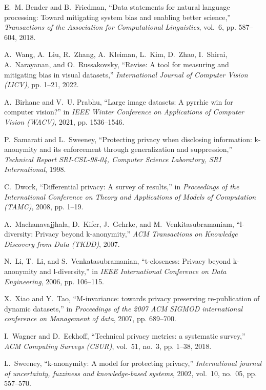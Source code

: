 \documentclass[journal]{IEEEtran}
\begin{document}
\begin{thebibliography}{100}
E.~M. Bender and B.~Friedman, ``Data statements for natural language
processing: Toward mitigating system bias and enabling better science,''
\emph{Transactions of the Association for Computational Linguistics}, vol.~6,
pp. 587--604, 2018.

A.~Wang, A.~Liu, R.~Zhang, A.~Kleiman, L.~Kim, D.~Zhao, I.~Shirai,
A.~Narayanan, and O.~Russakovsky, ``Revise: A tool for measuring and mitigating bias in visual datasets,'' \emph{International Journal of Computer Vision (IJCV)}, pp. 1--21, 2022.

A.~Birhane and V.~U. Prabhu, ``Large image datasets: A pyrrhic win for computer vision?'' in \emph{IEEE Winter Conference on Applications of Computer Vision (WACV)}, 2021, pp.
1536--1546.

P.~Samarati and L.~Sweeney, ``Protecting privacy when disclosing information: k-anonymity and its enforcement through generalization and suppression,'' \emph{Technical Report {SRI-CSL-98-04}, Computer Science Laboratory, {SRI} International}, 1998.

C.~Dwork, ``Differential privacy: A survey of results,'' in \emph{Proceedings of the International Conference on Theory and Applications of Models of Computation (TAMC)}, 2008, pp. 1--19.

A.~Machanavajjhala, D.~Kifer, J.~Gehrke, and M.~Venkitasubramaniam,
``l-diversity: Privacy beyond k-anonymity,'' \emph{ACM Transactions on Knowledge Discovery from Data (TKDD)}, 2007.

N.~Li, T.~Li, and S.~Venkatasubramanian, ``t-closeness: Privacy beyond k-anonymity and l-diversity,'' in \emph{ IEEE International Conference on Data Engineering}, 2006, pp. 106--115.

X.~Xiao and Y.~Tao, ``M-invariance: towards privacy preserving re-publication of dynamic datasets,'' in \emph{Proceedings of the 2007 ACM SIGMOD
international conference on Management of data}, 2007, pp. 689--700.

I.~Wagner and D.~Eckhoff, ``Technical privacy metrics: a systematic survey,'' \emph{ACM Computing Surveys (CSUR)}, vol.~51, no.~3, pp. 1--38, 2018.

L.~Sweeney, ``k-anonymity: A model for protecting privacy,''
\emph{International journal of uncertainty, fuzziness and knowledge-based systems}, 2002, vol.~10, no.~05, pp. 557--570.


\end{thebibliography}
\end{document}
